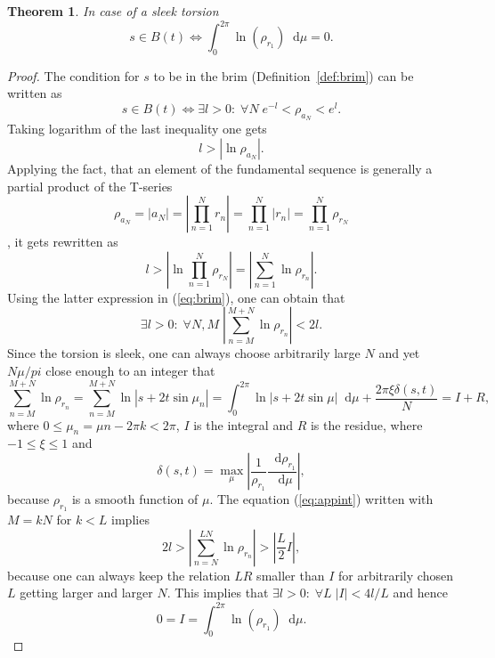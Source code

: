 \documentclass{article}
\newcommand{\be}{\begin{equation}}
\newcommand{\ee}{\end{equation}}
\newcommand*\df {\mathop{}\!\mathrm{d}}
\theoremstyle{plain}
\newtheorem{theorem}{Theorem}[section]
\theoremstyle{definition}
\begin{document}
    \begin{theorem}\label{th:intbrim}
        In case of a sleek torsion $$
            s \in B(t) \Leftrightarrow 
            \int_0^{2\pi} \ln (\rho_{r_1}) \df{\mu} = 0 
        .$$
    \end{theorem}
    \begin{proof}
        The condition for $s$ to be in the brim (Definition~\ref{def:brim}) can be written as 
        \be\label{eq:brim}
            s \in B(t) \Leftrightarrow \exists  l>0 
            :\; \forall N 
            \; e^{-l}<\rho_{ a_N}  < e^l
        .\ee 
        Taking logarithm of the last inequality one gets $$
            l>\left|\ln\rho_{ a_N}  \right|. 
        $$ Applying the fact, that an element of the fundamental sequence is generally a partial product of the T-series $$
        \rho_{ a_N} =  \left|a_N \right|  = \left| \prod_{n=1}^{N} r_n \right| =\prod_{n=1}^{N}\left| r_n \right| =\prod_{n=1}^{N}\rho_{ r_N} 
        $$, it gets rewritten as $$
            l>\left|\ln\prod_{n=1}^{N} \rho_{ r_N} \right| =  \left|\sum_{n=1}^{N}\ln\rho_{ r_n} \right|
        .$$ Using the latter expression in (\ref{eq:brim}), one can obtain that 
        \be\label{eq:dis}
             \exists  l>0  %
             :\; \forall N,M %
             \; \left|\sum_{n=M}^{M+N}\ln\rho_{ r_n} \right| < 2l
        .\ee 
        Since the torsion is sleek, one can always choose arbitrarily large $N$ and yet $N\mu/pi$ close enough to an integer that \be\label{eq:appint}
            \sum_{n=M}^{M+N}\ln\rho_{ r_n} = \sum_{n=M}^{M+N}\ln|s + 2t \sin\mu_n| = \int_0^{2\pi} \ln |s + 2t \sin\mu| \df{\mu} + \frac{2\pi\xi\delta(s,t)}N  = I + R,
        \ee where $0 \le \mu_n = \mu n - 2\pi k < 2 \pi$, $I$ is the integral and $R$ is the residue, where  $-1\le\xi\le1 $ and  $$
            \delta(s,t)= \max_{\mu}\left| \frac{1}{\rho_{ r_1}}\frac{\df{\rho_{ r_1}}}{\df{\mu}} \right|,
        $$  because ${\rho_{ r_1}}$ is a smooth function of $\mu$.
        The equation (\ref{eq:appint}) written with $M=kN$ for $k<L$ implies $$
            2l>\left|\sum_{n=N}^{LN}\ln\rho_{ r_n}\right| >\left|\frac L 2 I \right|,
        $$ because one can always keep the relation $LR$ smaller than $I$ for arbitrarily chosen $L$ getting larger and larger $N$.   
        This implies that $ \exists l>0:\; \forall L\; |I|<4l/L$ and hence $$
            0 = I = \int_0^{2\pi} \ln (\rho_{r_1}) \df{\mu} 
        .$$
    \end{proof}
\end{document}
